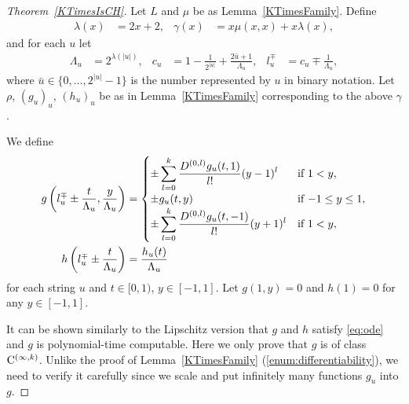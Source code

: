 \begin{proof}[Theorem~\ref{KTimesIsCH}]
Let $L$ and $\mu$ be as Lemma~\ref{KTimesFamily}.
Define
 \begin{align}
  \lambda(x) &= 2x + 2,&
  \gamma(x) &= x \mu(x, x) + x \lambda(x),
 \end{align}
and for each $u$ let
\begin{align}
 \Lambda_u 
 &= 2^{\lambda(|u|)}, &
 c_u 
 &= 1-\frac{1}{2^{|u|}}+\frac{2\bar{u}+1}{\Lambda_u}, &
 l_u^\mp 
 &= c_u\mp\frac{1}{\Lambda_u},
\end{align}  
 where $\bar u \in \{0, \dots, 2^{|u|} - 1\}$ is the number represented by $u$ in binary notation.
Let $\rho$, $(g_u)_u$, $(h_u)_u$ be as in Lemma~\ref{KTimesFamily} 
corresponding to the above $\gamma$.

We define
 \begin{align} \label{eq:g}
 g \left(l^\mp_u \pm \frac{t}{\Lambda_u}, \frac{y}{\Lambda_u}\right)
  &= \begin{cases}
      \pm \displaystyle \sum_{l=0}^k \frac{D^{(0,l)}g_u(t,1)}{l!} (y-1)^l 
      &  \text{if} \ 1<y, \\
      \pm g_u(t, y)      & \text{if} \ {-1} \le y \le 1, \\
      \pm \displaystyle \sum_{l=0}^k \frac{D^{(0,l)}g_u(t,-1)}{l!} (y+1)^l  
      &  \text{if} \ 1<y, \\
    \end{cases} 
  \\
 h \left( l^\mp_u \pm \frac{t}{\Lambda_u} \right) 
  & = \frac{h_u(t)}{\Lambda_u}
\end{align}
for each string $u$ and $t \in [0,1)$, $y \in [-1, 1]$.
Let $g(1,y) = 0$ and $h(1) = 0$ for any $y \in [-1,1]$.

It can be shown similarly to the Lipschitz version 
\cite[Theorem 3.2]{kawamura2010lipschitz}
that $g$ and $h$ satisfy \eqref{eq:ode} and $g$ is polynomial-time computable.
Here we only prove that $g$ is of class $\mathrm C^{(\infty, k)}$.
Unlike the proof of Lemma~\ref{KTimesFamily} (\ref{enum:differentiability}), we need to verify it carefully since we scale and put infinitely many functions $g_u$ into $g$.


\end{proof}
